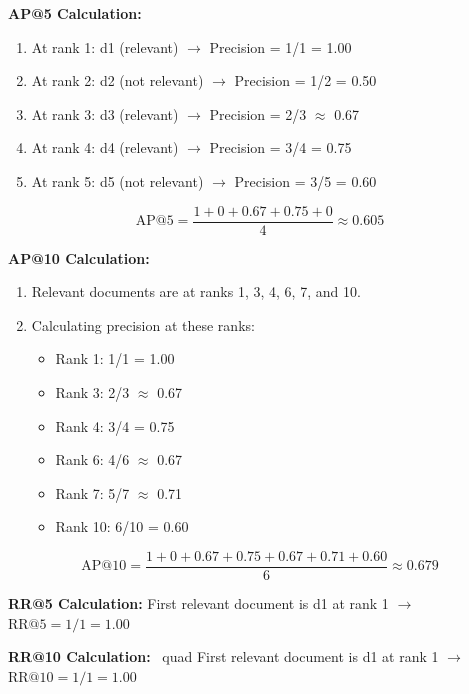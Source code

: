 \documentclass[a4paper, utf8]{ctexart}
\begin{document}
	\textbf{AP@5 Calculation:}
	
	\begin{enumerate}[itemsep=2pt, topsep=0pt, parsep=0pt]
	    \item At rank 1: d1 (relevant) $\rightarrow$ Precision = 1/1 = 1.00
	    \item At rank 2: d2 (not relevant) $\rightarrow$ Precision = 1/2 = 0.50
	    \item At rank 3: d3 (relevant) $\rightarrow$ Precision = 2/3 $\approx$ 0.67
	    \item At rank 4: d4 (relevant) $\rightarrow$ Precision = 3/4 = 0.75
	    \item At rank 5: d5 (not relevant) $\rightarrow$ Precision = 3/5 = 0.60
	\end{enumerate}
	
	\begin{equation}
		\text{AP@5} = \frac{1 + 0 + 0.67 + 0.75 + 0}{4} \approx 0.605
		\nonumber
	\end{equation}
	
	\textbf{AP@10 Calculation:}
	
	\begin{enumerate}[itemsep=2pt, topsep=0pt, parsep=0pt]
	    \item Relevant documents are at ranks 1, 3, 4, 6, 7, and 10.
	    \item Calculating precision at these ranks:
	    \begin{itemize}[itemsep=2pt, topsep=0pt, parsep=0pt]
	        \item Rank 1: 1/1 = 1.00
	        \item Rank 3: 2/3 $\approx$ 0.67
	        \item Rank 4: 3/4 = 0.75
	        \item Rank 6: 4/6 $\approx$ 0.67
	        \item Rank 7: 5/7 $\approx$ 0.71
	        \item Rank 10: 6/10 = 0.60
	    \end{itemize}
	\end{enumerate}
	
	\begin{equation}
		\text{AP@10} = \frac{1 + 0 + 0.67 + 0.75 + 0.67 + 0.71 + 0.60}{6} \approx 0.679
		\nonumber
	\end{equation}

	\textbf{RR@5 Calculation:} \quad First relevant document is d1 at rank 1 $\rightarrow$ $\text{RR@5} = 1/1 = 1.00$
	
	\textbf{RR@10 Calculation:} \ quad First relevant document is d1 at rank 1 $\rightarrow$ $\text{RR@10} = 1/1 = 1.00$
	
\end{document}
